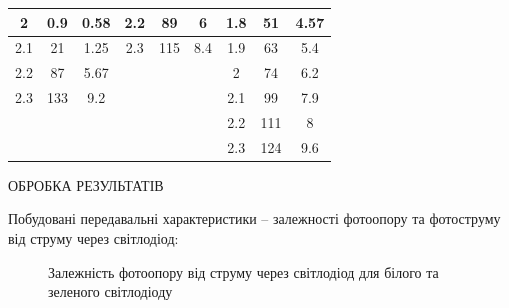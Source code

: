 \documentclass[a4paper,14pt]{extreport}
\begin{document}
\begin{landscape}
\begin{table}[]
\begin{tabular}{|ccc|ccc|ccc|}
\multicolumn{1}{|c|}{2}      & \multicolumn{1}{c|}{0.9}      & 0.58      & \multicolumn{1}{c|}{2.2}    & \multicolumn{1}{c|}{89}      & 6         & \multicolumn{1}{c|}{1.8}    & \multicolumn{1}{c|}{51}      & 4.57      \\ \hline
\multicolumn{1}{|c|}{2.1}    & \multicolumn{1}{c|}{21}       & 1.25      & \multicolumn{1}{c|}{2.3}    & \multicolumn{1}{c|}{115}     & 8.4       & \multicolumn{1}{c|}{1.9}    & \multicolumn{1}{c|}{63}      & 5.4       \\ \hline
\multicolumn{1}{|c|}{2.2}    & \multicolumn{1}{c|}{87}       & 5.67      & \multicolumn{1}{c|}{}       & \multicolumn{1}{c|}{}        &           & \multicolumn{1}{c|}{2}      & \multicolumn{1}{c|}{74}      & 6.2       \\ \hline
\multicolumn{1}{|c|}{2.3}    & \multicolumn{1}{c|}{133}      & 9.2       & \multicolumn{1}{c|}{}       & \multicolumn{1}{c|}{}        &           & \multicolumn{1}{c|}{2.1}    & \multicolumn{1}{c|}{99}      & 7.9       \\ \hline
\multicolumn{1}{|c|}{}       & \multicolumn{1}{c|}{}         &           & \multicolumn{1}{c|}{}       & \multicolumn{1}{c|}{}        &           & \multicolumn{1}{c|}{2.2}    & \multicolumn{1}{c|}{111}     & 8         \\ \hline
\multicolumn{1}{|c|}{}       & \multicolumn{1}{c|}{}         &           & \multicolumn{1}{c|}{}       & \multicolumn{1}{c|}{}        &           & \multicolumn{1}{c|}{2.3}    & \multicolumn{1}{c|}{124}     & 9.6       \\ \hline
\end{tabular}
\end{table}

  
\end{landscape}

\begin{center}
ОБРОБКА РЕЗУЛЬТАТІВ
\end{center}
Побудовані
 передавальні
характеристики – залежності фотоопору та фотоструму від струму через
світлодіод:
\begin{figure}[h!]
\caption{Залежність фотоопору від струму через світлодіод для
білого та зеленого світлодіоду}
\end{figure}
\end{document}
